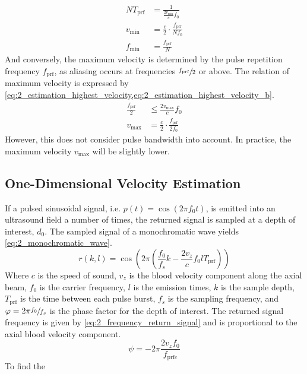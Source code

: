 \begin{subequations}
	\begin{align}
		N T_{\mathrm{prf}} &= \frac{1}{\frac{2v_{\mathrm{min}}}{c}f_{0}} \label{eq:2_estimation_lowest_velocity} \\
		v_{\mathrm{min}} &= \frac{c}{2}\cdot\frac{f_{\mathrm{prf}}}{N f_{0}} \label{eq:2_estimation_lowest_velocity_b} \\
		f_{\mathrm{min}} &= \frac{f_{\mathrm{prf}}}{N} \label{eq:2_estimation_lowest_frequency}
	\end{align}
\end{subequations}
And conversely, the maximum velocity is determined by the pulse repetition frequency $f_{\mathrm{prf}}$, as aliasing occurs at frequencies $\sfrac{f_{\mathrm{prf}}}{2}$ or above. The relation of maximum velocity is expressed by \cref{eq:2_estimation_highest_velocity,eq:2_estimation_highest_velocity_b}.
\begin{subequations}
	\begin{align}
		\frac{f_{\mathrm{prf}}}{2} &\le \frac{2v_{\mathrm{max}}}{c}f_{0} \label{eq:2_estimation_highest_velocity} \\
		v_{\mathrm{max}} &= \frac{c}{2}\cdot \frac{f_{\mathrm{prf}}}{2f_{0}} \label{eq:2_estimation_highest_velocity_b}
	\end{align}
\end{subequations}
However, this does not consider pulse bandwidth into account. In practice, the maximum velocity $v_{\mathrm{max}}$ will be slightly lower.
\subsection{One-Dimensional Velocity Estimation}
If a pulsed sinusoidal signal, i.e. $p(t)= \cos \left( 2\pi f_{0} t \right)$, is emitted into an ultrasound field a number of times, the returned signal is sampled at a depth of interest, $d_{0}$. The sampled signal of a \gls{monochromatic wave} yields \cref{eq:2_monochromatic_wave}.
\begin{equation} \label{eq:2_monochromatic_wave}
	r \left(k, l \right) = \cos \left( 2\pi \left( \frac{f_{0}}{f_{s}} k - \frac{2v_{z}}{c} f_{0} l T_{\mathrm{prf}} \right) \right)
\end{equation}
Where $c$ is the speed of sound, $v_{z}$ is the blood velocity component along the axial beam, $f_{0}$ is the carrier frequency, $l$ is the emission times, $k$ is the sample depth, $T_{\mathrm{prf}}$ is the time between each pulse burst, $f_{s}$ is the sampling frequency, and $\varphi = 2\pi \sfrac{f_{0}}{f_{s}}$ is the phase factor for the depth of interest. The returned signal frequency is given by \cref{eq:2_frequency_return_signal} and is proportional to the axial blood velocity component.
\begin{equation} \label{eq:2_frequency_return_signal}
	\psi = -2\pi \frac{2v_{z}f_{0}}{f_{\mathrm{prf}c}}
\end{equation}
To find the
